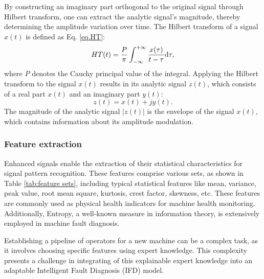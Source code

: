 \documentclass[lettersize,journal]{IEEEtran}
\begin{document}
By constructing an imaginary part orthogonal to the original signal through Hilbert transform, one can extract the analytic signal's magnitude, thereby determining the amplitude variation over time. The Hilbert transform of a signal $x(t)$ is defined as Eq. \ref{eq.HT}:
\begin{equation}\label{eq.HT}
HT(t) = \frac{P}{\pi }\int_{ - \infty }^{ + \infty } {\frac{{x(\tau )}}{{t - \tau }}} {\rm{d}}\tau,
\end{equation}
where $P$ denotes the Cauchy principal value of the integral. Applying the Hilbert transform to the signal $x(t)$ results in its analytic signal $z(t)$, which consists of a real part $x(t)$ and an imaginary part $y(t)$:
\begin{equation}\label{eq2}
z(t) = x(t) + jy(t).
\end{equation}
The magnitude of the analytic signal $|z(t)|$ is the envelope of the signal $x(t)$, which contains information about its amplitude modulation. 

\subsubsection{Feature extraction}
Enhanced signals enable the extraction of their statistical characteristics for signal pattern recognition. These features comprise various sets, as shown in Table \ref{tab:feature sets}, including typical statistical features like mean, variance, peak value, root mean square, kurtosis, crest factor, skewness, etc\cite{badihiComprehensiveReviewSignalBased2022a, leiApplicationsMachineLearning2020d}. These features are commonly used as physical health indicators for machine health monitoring. Additionally, Entropy, a well-known measure in information theory, is extensively employed in machine fault diagnosis. 

Establishing a pipeline of operators for a new machine can be a complex task, as it involves choosing specific features using expert knowledge. This complexity presents a challenge in integrating of this explainable expert knowledge into an adaptable Intelligent Fault Diagnosis (IFD) model. 
\end{document}
